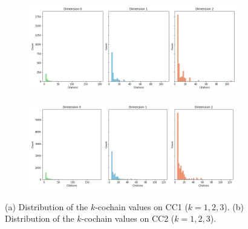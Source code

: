 \begin{figure}[tb]
\centering
 \begin{subfigure}[t]{-0.8\textwidth}
 \vspace{-4cm}
  \end{subfigure}
\begin{subfigure}[t]{0.8\textwidth}
\centering
   \includegraphics[scale=0.26]{./figures/distribution_cochain_150250.png}
\end{subfigure}
 \begin{subfigure}[t]{0.8\textwidth}
  \end{subfigure}
\begin{subfigure}[t]{0.8\textwidth}
\centering
\vspace{-0.5cm}
   \includegraphics[scale=0.26]{./figures/distribution_cochain_11779.png}
\end{subfigure}
\caption{(a) Distribution of the $k$-cochain values on CC1 ($k=1,2,3$). (b) Distribution of the $k$-cochain values on CC2 ($k=1,2,3$).}
\label{fig:dist-cochains}
\end{figure}

